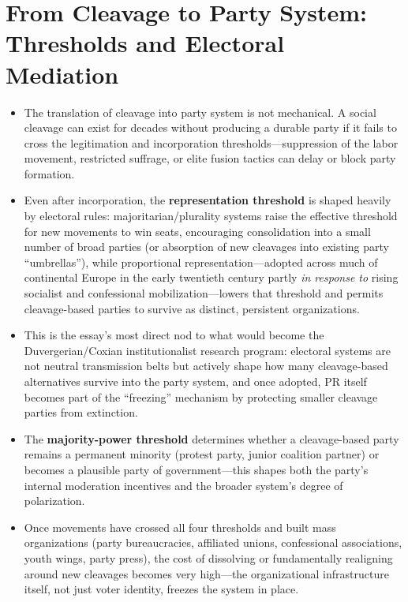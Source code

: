 \documentclass[12pt]{article}
\begin{document}
\section{From Cleavage to Party System: Thresholds and Electoral Mediation}

\begin{itemize}[leftmargin=*, itemsep=4pt]
    \item The translation of cleavage into party system is not mechanical. A social cleavage can exist for decades without producing a durable party if it fails to cross the legitimation and incorporation thresholds---suppression of the labor movement, restricted suffrage, or elite fusion tactics can delay or block party formation.
    \item Even after incorporation, the \textbf{representation threshold} is shaped heavily by electoral rules: majoritarian/plurality systems raise the effective threshold for new movements to win seats, encouraging consolidation into a small number of broad parties (or absorption of new cleavages into existing party ``umbrellas''), while proportional representation---adopted across much of continental Europe in the early twentieth century partly \emph{in response to} rising socialist and confessional mobilization---lowers that threshold and permits cleavage-based parties to survive as distinct, persistent organizations.
    \item This is the essay's most direct nod to what would become the Duvergerian/Coxian institutionalist research program: electoral systems are not neutral transmission belts but actively shape how many cleavage-based alternatives survive into the party system, and once adopted, PR itself becomes part of the ``freezing'' mechanism by protecting smaller cleavage parties from extinction.
    \item The \textbf{majority-power threshold} determines whether a cleavage-based party remains a permanent minority (protest party, junior coalition partner) or becomes a plausible party of government---this shapes both the party's internal moderation incentives and the broader system's degree of polarization.
    \item Once movements have crossed all four thresholds and built mass organizations (party bureaucracies, affiliated unions, confessional associations, youth wings, party press), the cost of dissolving or fundamentally realigning around new cleavages becomes very high---the organizational infrastructure itself, not just voter identity, freezes the system in place.
\end{itemize}
\end{document}
